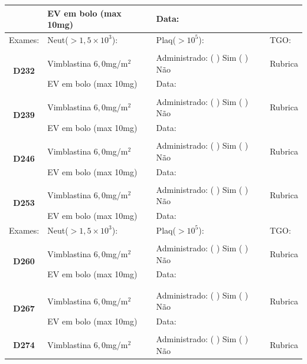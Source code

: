 \documentclass[11pt,a4paper,oldfontcommands]{memoir}
\begin{document}
\begin{center}
\begin{longtable}{p{1cm}p{5cm}|p{5cm}|p{3cm}}
    \multicolumn{1}{c|}{}&{EV em bolo (max 10mg)}&{Data:}&\\
    \hline
    {\tiny{Exames:}}&{\tiny{Neut(\(>1,5\times10^3\)):}}&{\tiny{Plaq(\(>10^5\)):}}&{\tiny{TGO:}}
    \\
    \hline
    \\
    \hline
    \multicolumn{1}{c|}{\multirow{2}{*}{\textbf{D232}}}&{Vimblastina \(6,0\)mg/m\(^2\)}&{Administrado: (  ) Sim (  ) Não}&{Rubrica}\\
    \multicolumn{1}{c|}{}&{EV em bolo (max 10mg)}&{Data:}&\\
    \hline
    \\
    \hline
    \multicolumn{1}{c|}{\multirow{2}{*}{\textbf{D239}}}&{Vimblastina \(6,0\)mg/m\(^2\)}&{Administrado: (  ) Sim (  ) Não}&{Rubrica}\\
    \multicolumn{1}{c|}{}&{EV em bolo (max 10mg)}&{Data:}&\\
    \hline
    \\
    \hline
    \multicolumn{1}{c|}{\multirow{2}{*}{\textbf{D246}}}&{Vimblastina \(6,0\)mg/m\(^2\)}&{Administrado: (  ) Sim (  ) Não}&{Rubrica}\\
    \multicolumn{1}{c|}{}&{EV em bolo (max 10mg)}&{Data:}&\\
    \hline
    \\
    \hline
    \multicolumn{1}{c|}{\multirow{2}{*}{\textbf{D253}}}&{Vimblastina \(6,0\)mg/m\(^2\)}&{Administrado: (  ) Sim (  ) Não}&{Rubrica}\\
    \multicolumn{1}{c|}{}&{EV em bolo (max 10mg)}&{Data:}&\\
    \hline
    {\tiny{Exames:}}&{\tiny{Neut(\(>1,5\times10^3\)):}}&{\tiny{Plaq(\(>10^5\)):}}&{\tiny{TGO:}}
    \\
    \hline
    \\
    \hline
    \multicolumn{1}{c|}{\multirow{2}{*}{\textbf{D260}}}&{Vimblastina \(6,0\)mg/m\(^2\)}&{Administrado: (  ) Sim (  ) Não}&{Rubrica}\\
    \multicolumn{1}{c|}{}&{EV em bolo (max 10mg)}&{Data:}&\\
    \hline\\[0.6cm]
    \\
    \hline
    \multicolumn{1}{c|}{\multirow{2}{*}{\textbf{D267}}}&{Vimblastina \(6,0\)mg/m\(^2\)}&{Administrado: (  ) Sim (  ) Não}&{Rubrica}\\
    \multicolumn{1}{c|}{}&{EV em bolo (max 10mg)}&{Data:}&\\
    \hline
    \\
    \hline
    \multicolumn{1}{c|}{\multirow{2}{*}{\textbf{D274}}}&{Vimblastina \(6,0\)mg/m\(^2\)}&{Administrado: (  ) Sim (  ) Não}&{Rubrica}\\

\end{longtable}
\end{center}
\end{document}
